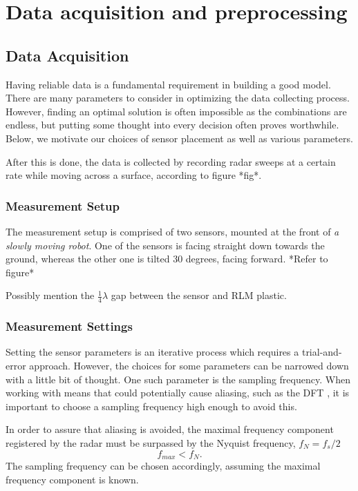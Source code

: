 \chapter{Data acquisition and preprocessing}
\section{Data Acquisition}
Having reliable data is a fundamental requirement in building a good model. There are many parameters to consider in optimizing the data collecting process. However,  finding an optimal solution is often impossible as the combinations are endless, but putting some thought into every decision often proves worthwhile. Below, we motivate our choices of sensor placement as well as various parameters.

After this is done, the data is collected by recording radar sweeps at a certain rate while moving across a surface, according to figure *fig*.

\subsection{Measurement Setup}
The measurement setup is comprised of two sensors, mounted at the front of \emph{a slowly moving robot}. One of the sensors is facing straight down towards the ground, whereas the other one is tilted 30 degrees, facing forward. *Refer to figure*

Possibly mention the $\frac14\lambda$ gap between the sensor and RLM plastic.


\subsection{Measurement Settings}
Setting the sensor parameters is an iterative process which requires a trial-and-error approach. However, the choices for some parameters can be narrowed down with a little bit of thought. One such parameter is the sampling frequency. When working with means that could potentially cause aliasing, such as the DFT \citep{lindgren_rootzeŽn_sandsten_2013}, it is important to choose a sampling frequency high enough to avoid this.

In order to assure that aliasing is avoided, the maximal frequency component registered by the radar must be surpassed by the Nyquist frequency, $f_N=f_s/2$
\begin{equation}
\label{eq:nyquist}
	f_{max} < f_N.
\end{equation}
The sampling frequency can be chosen accordingly, assuming the maximal frequency component is known. 

